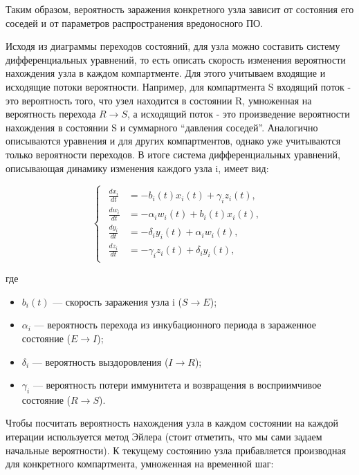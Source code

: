 \documentclass[
  english,
  russian,
  12pt,
  a4paper,
]{phdthesr}
\providecommand{\tightlist}{%
  \setlength{\itemsep}{0pt}\setlength{\parskip}{0pt}}
\begin{document}
Таким образом, вероятность заражения конкретного узла зависит от
состояния его соседей и от параметров распространения вредоносного ПО.

Исходя из диаграммы переходов состояний, для узла можно составить
систему дифференциальных уравнений, то есть описать скорость изменения
вероятности нахождения узла в каждом компартменте. Для этого учитываем
входящие и исходящие потоки вероятности. Например, для компартмента S
входящий поток - это вероятность того, что узел находится в состоянии R,
умноженная на вероятность перехода \(R \rightarrow S\), а исходящий
поток - это произведение вероятности нахождения в состоянии S и
суммарного \enquote{давления соседей}. Аналогично описываются уравнения
и для других компартментов, однако уже учитываются только вероятности
переходов. В итоге система дифференциальных уравнений, описывающая
динамику изменения каждого узла i, имеет вид:

\[
\begin{cases}
\begin{aligned}
\frac{dx_i}{dt} &= -b_i(t)x_i(t) + \gamma_i z_i(t),\\
\frac{dw_i}{dt} &= -\alpha_i w_i(t) + b_i(t)x_i(t),  \\
\frac{dy_i}{dt} &= -\delta_i y_i(t) + \alpha_i w_i(t),\\
\frac{dz_i}{dt} &= -\gamma_i z_i(t) + \delta_i y_i(t),
\end{aligned}
\end{cases}
\]

где

\begin{itemize}
\tightlist
\item
  \(b_i(t)\) --- скорость заражения узла i (\(S \rightarrow E\));
\item
  \(\alpha_i\) --- вероятность перехода из инкубационного периода в
  зараженное состояние (\(E \rightarrow I\));
\item
  \(\delta_i\) --- вероятность выздоровления (\(I \rightarrow R\));
\item
  \(\gamma_i\) --- вероятность потери иммунитета и возвращения в
  восприимчивое состояние (\(R \rightarrow S\)).
\end{itemize}

Чтобы посчитать вероятность нахождения узла в каждом состоянии на каждой
итерации используется метод Эйлера (стоит отметить, что мы сами задаем
начальные вероятности). К текущему состоянию узла прибавляется
производная для конкретного компартмента, умноженная на временной шаг:
\end{document}

